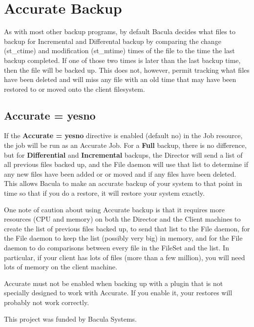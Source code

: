 \section{Accurate Backup}

As with most other backup programs, by default Bacula decides what files to
backup for Incremental and Differental backup by comparing the change
(st\_ctime) and modification (st\_mtime) times of the file to the time the last
backup completed.  If one of those two times is later than the last backup
time, then the file will be backed up.  This does not, however, permit tracking
what files have been deleted and will miss any file with an old time that may
have been restored to or moved onto the client filesystem.

\subsection{Accurate = \lt{}yes\vb{}no\gt{}}
If the {\bf Accurate = \lt{}yes\vb{}no\gt{}} directive is enabled (default no) in
the Job resource, the job will be run as an Accurate Job. For a {\bf Full}
backup, there is no difference, but for {\bf Differential} and {\bf
  Incremental} backups, the Director will send a list of all previous files
backed up, and the File daemon will use that list to determine if any new files
have been added or or moved and if any files have been deleted. This allows
Bacula to make an accurate backup of your system to that point in time so that
if you do a restore, it will restore your system exactly.  

One note of caution
about using Accurate backup is that it requires more resources (CPU and memory)
on both the Director and the Client machines to create the list of previous
files backed up, to send that list to the File daemon, for the File daemon to
keep the list (possibly very big) in memory, and for the File daemon to do
comparisons between every file in the FileSet and the list.  In particular,
if your client has lots of files (more than a few million), you will need
lots of memory on the client machine.

Accurate must not be enabled when backing up with a plugin that is not
specially designed to work with Accurate. If you enable it, your restores
will probably not work correctly.

This project was funded by Bacula Systems.
                                       


